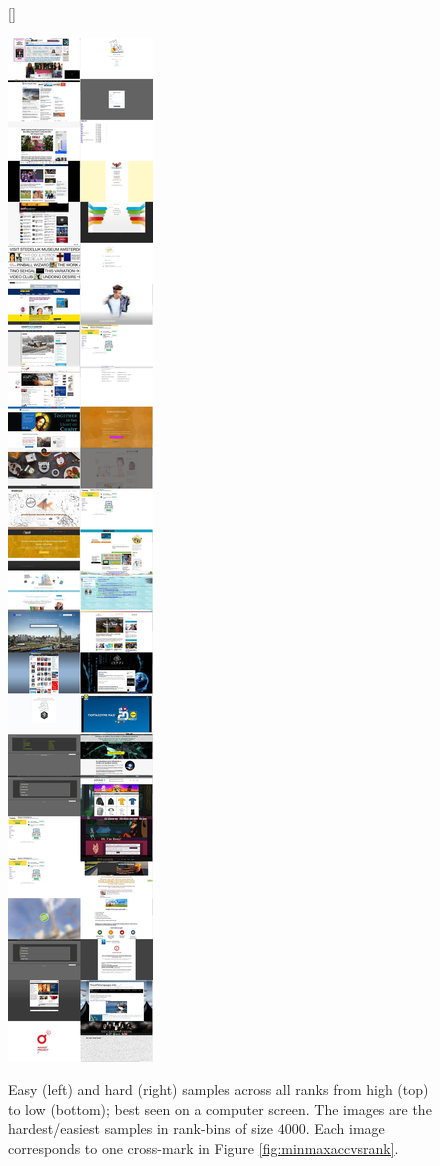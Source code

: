\begin{figure}
    [\FBwidth]
    {\caption[Easy and hard samples across all ranks]{Easy (left) and hard (right) samples across all ranks from high (top) to low (bottom); best seen on a computer screen. The images are the hardest/easiest samples in rank-bins of size $4000$. Each image corresponds to one cross-mark in Figure \ref{fig:minmaxaccvsrank}.}\label{fig:hardandeasysamples}}
    {\includegraphics[height=\textheight]{resources/hard-easy.jpg}}
\end{figure}

